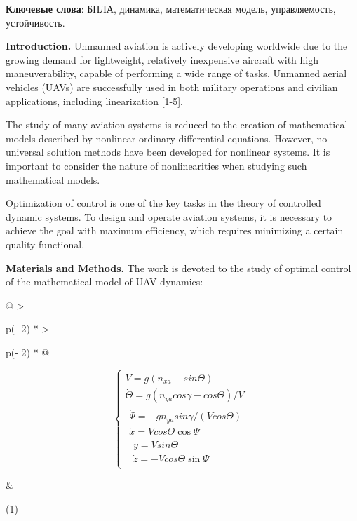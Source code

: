 {\bfseries Ключевые слова}: БПЛА, динамика, математическая модель,
управляемость, устойчивость.
\begin{multicols}{2}

{\bfseries Introduction.} Unmanned aviation is actively developing
worldwide due to the growing demand for lightweight, relatively
inexpensive aircraft with high maneuverability, capable of performing a
wide range of tasks. Unmanned aerial vehicles (UAVs) are successfully
used in both military operations and civilian applications, including
linearization {[}1-5{]}.

The study of many aviation systems is reduced to the creation of
mathematical models described by nonlinear ordinary differential
equations. However, no universal solution methods have been developed
for nonlinear systems. It is important to consider the nature of
nonlinearities when studying such mathematical models.

Optimization of control is one of the key tasks in the theory of
controlled dynamic systems. To design and operate aviation systems, it
is necessary to achieve the goal with maximum efficiency, which requires
minimizing a certain quality functional.

{\bfseries Materials and Methods.} The work is devoted to the study of
optimal control of the mathematical model of UAV dynamics:
\end{multicols}

\begin{longtable}[]{@{}
  >{\raggedright\arraybackslash}p{(\columnwidth - 2\tabcolsep) * }
  >{\raggedright\arraybackslash}p{(\columnwidth - 2\tabcolsep) * }@{}}
\begin{minipage}[b]{\linewidth}\raggedright
\[\left\{ \begin{matrix}
\dot{V} = g(n_{xa} - sin\Theta) \\
\dot{\Theta} = g(n_{ya}cos\gamma - cos\Theta)/V \\
\begin{matrix}
\dot{\Psi} = - gn_{ya}sin\gamma/(Vcos\Theta) \\
\dot{x} = Vcos\Theta\cos\Psi \\
\begin{matrix}
\dot{y} = Vsin\Theta \\
\dot{z} = - Vcos\Theta\sin\Psi
\end{matrix}
\end{matrix}
\end{matrix} \right.\ \]
\end{minipage} & \begin{minipage}[b]{\linewidth}\raggedright
(1)
\end{minipage} \\
\end{longtable}

